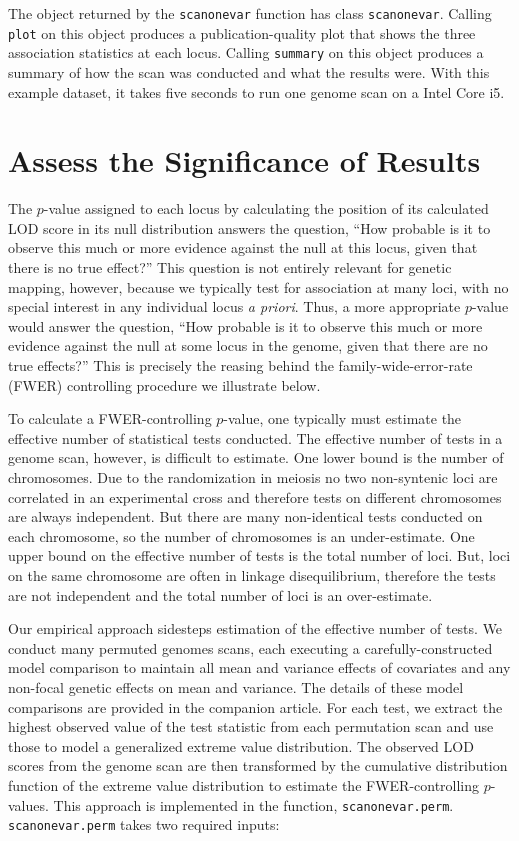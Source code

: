 \documentclass[9pt,twocolumn,twoside]{gsag3jnl}
\begin{document}
The object returned by the \texttt{scanonevar} function has class \texttt{scanonevar}.
Calling \texttt{plot} on this object produces a publication-quality plot that shows the three association statistics at each locus.
Calling \texttt{summary} on this object produces a summary of how the scan was conducted and what the results were.
With this example dataset, it takes five seconds to run one genome scan on a Intel Core i5.





\section*{Assess the Significance of Results}

The $p$-value assigned to each locus by calculating the position of its calculated LOD score in its null distribution answers the question, ``How probable is it to observe this much or more evidence against the null at this locus, given that there is no true effect?''
This question is not entirely relevant for genetic mapping, however, because we typically test for association at many loci, with no special interest in any individual locus \textit{a priori}.
Thus, a more appropriate $p$-value would answer the question, ``How probable is it to observe this much or more evidence against the null at some locus in the genome, given that there are no true effects?''
This is precisely the reasing behind the family-wide-error-rate (FWER) controlling procedure we illustrate below.

To calculate a FWER-controlling $p$-value, one typically must estimate the effective number of statistical tests conducted.
The effective number of tests in a genome scan, however, is difficult to estimate.
One lower bound is the number of chromosomes.
Due to the randomization in meiosis no two non-syntenic loci are correlated in an experimental cross and therefore tests on different chromosomes are always independent.
But there are many non-identical tests conducted on each chromosome, so the number of chromosomes is an under-estimate.
One upper bound on the effective number of tests is the total number of loci.
But, loci on the same chromosome are often in linkage disequilibrium, therefore the tests are not independent and the total number of loci is an over-estimate.

Our empirical approach sidesteps estimation of the effective number of tests.
We conduct many permuted genomes scans, each executing a carefully-constructed model comparison to maintain all mean and variance effects of covariates and any non-focal genetic effects on mean and variance.
The details of these model comparisons are provided in the companion article.
For each test, we extract the highest observed value of the test statistic from each permutation scan and use those to model a generalized extreme value distribution.
The observed LOD scores from the genome scan are then transformed by the cumulative distribution function of the extreme value distribution to estimate the FWER-controlling $p$-values.
This approach is implemented in the function, \texttt{scanonevar.perm}.
\texttt{scanonevar.perm} takes two required inputs:
\end{document}
